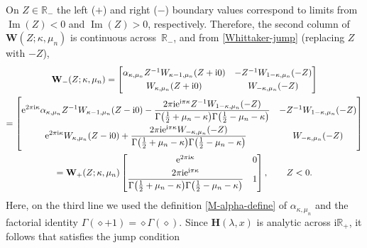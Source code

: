 \documentclass[pdftex]{sigma}
\numberwithin{equation}{section}
\newcommand{\ee}{\mathrm{e}}
\newcommand{\ii}{\mathrm{i}}
\newcommand{\para}[1]{\breve{#1}}
\newcommand{\R}{{\mathbb{R}}}
\newcommand{\im}{\operatorname{Im}}
\begin{document}
On $Z\in\R_-$ the left ($+$) and right ($-$) boundary values correspond to limits from ${\im(Z)<0}$ and $\im(Z)>0$, respectively. Therefore, the second column of $\mathbf{W}(Z;\kappa,\mu_n)$ is continuous across~$\mathbb{R}_-$, and from \eqref{Whittaker-jump} (replacing $Z$ with $-Z$),
\begin{gather*}%
 \mathbf{W}_{-}(Z;\kappa,\mu_n)
 =
 \begin{bmatrix}
 \alpha_{\kappa,\mu_n}Z^{-1}W_{\kappa-1,\mu_n}(Z+\ii 0) & -Z^{-1}W_{1-\kappa,\mu_n}(-Z)\vspace{1mm}\\
 W_{\kappa,\mu_n}(Z+\ii 0) & W_{-\kappa,\mu_n}(-Z)
 \end{bmatrix}\\
 =\begin{bmatrix}
 \displaystyle \ee^{2\pi \ii\kappa}\alpha_{\kappa,\mu_n}Z^{-1}W_{\kappa-1,\mu_n}(Z-\ii 0) - \frac{2\pi \ii\ee^{\ii\pi \kappa}Z^{-1}W_{1-\kappa,\mu_n}(-Z)}{\Gamma\big(\frac{1}{2}+\mu_n-\kappa\big)\Gamma\big(\frac{1}{2}-\mu_n-\kappa\big)}& -Z^{-1}W_{1-\kappa,\mu_n}(-Z)\vspace{1mm}\\
 \displaystyle \ee^{2\pi \ii\kappa}W_{\kappa,\mu_n}(Z-\ii 0)+\frac{2\pi \ii\ee^{\ii\pi\kappa}W_{-\kappa,\mu_n}(-Z)}{\Gamma\big(\frac{1}{2}+\mu_n-\kappa\big)\Gamma\big(\frac{1}{2}-\mu_n-\kappa\big)} & W_{-\kappa,\mu_n}(-Z)
 \end{bmatrix}\\
 =\mathbf{W}_{+}(Z;\kappa,\mu_n)\begin{bmatrix}
 \ee^{2\pi \ii\kappa} & 0\vspace{1mm}\\
 \displaystyle \frac{2\pi \ii\ee^{\ii\pi\kappa}}{\Gamma\big(\frac{1}{2}+\mu_n-\kappa\big)\Gamma\big(\frac{1}{2}-\mu_n-\kappa\big)} & 1
 \end{bmatrix},\qquad Z<0.
\end{gather*}
Here, on the {third} line we used the definition \eqref{M-alpha-define} of $\alpha_{\kappa,\mu_n}$ and the factorial identity $\Gamma(\diamond+1)=\diamond\Gamma(\diamond)$. Since $\mathbf{H}(\lambda,x)$ is analytic across $\ii\mathbb{R}_+$, it follows that \smash{$\para{\mathbf{\Phi}}^{(\infty)}(\lambda)=\para{\mathbf{\Phi}}_n^{(\infty)}(\lambda,x)$} satisfies the jump condition
\end{document}
